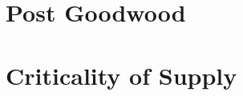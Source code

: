 \documentclass[noraggedright]{turabian-researchpaper}
\begin{document}


\section{Post Goodwood}



\section{} %


\section{Criticality of Supply}

\end{document}
